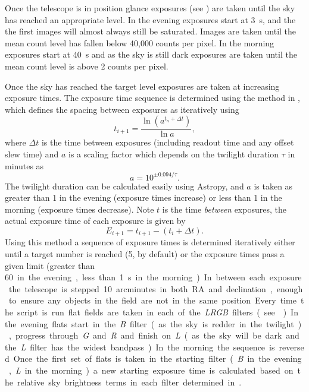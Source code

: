 \begin{colsection}
\begin{colsection}
Once the telescope is in position glance exposures (see ) are taken until the sky has reached an appropriate level. In the evening exposures start at \SI{3}{\second}, and the the first images will almost always still be saturated. Images are taken until the mean count level has fallen below 40,000 counts per pixel. In the morning exposures start at \SI{40}{\second} and as the sky is still dark exposures are taken until the mean count level is above 2 counts per pixel.

Once the sky has reached the target level exposures are taken at increasing exposure times. The exposure time sequence is determined using the method in \citet{flats3}, which defines the spacing between exposures as iteratively using
%
\begin{equation}
    t_{i+1} = \frac{\ln{(a^{t_n+\Delta t})}}{\ln{a}},
    \label{eq:sky}
\end{equation}
%
where $\Delta t$ is the time between exposures (including readout time and any offset slew time) and $a$ is a scaling factor which depends on the twilight duration $\tau$ in minutes as
%
\begin{equation}
    a = 10^{\pm 0.094/\tau}.
    \label{eq:sky2}
\end{equation}
%
The twilight duration can be calculated easily using Astropy, and $a$ is taken as greater than 1 in the evening (exposure times increase) or less than 1 in the morning (exposure times decrease). Note $t$ is the time \emph{between} exposures, the actual exposure time of each exposure is given by
%
\begin{equation}
    E_{i+1} = t_{i+1} - (t_i + \Delta t).
    \label{eq:sky3}
\end{equation}
%
Using this method a sequence of exposure times is determined iteratively either until a target number is reached (5, by default) or the exposure times pass a given limit (greater than \SI{60} in the evening, less than \SI{1}{\second} in the morning). In between each exposure the telescope is stepped 10~arcminutes in both RA and declination, enough to ensure any objects in the field are not in the same position.

Every time the script is run flat fields are taken in each of the \textit{LRGB} filters (see ). In the evening flats start in the \textit{B} filter (as the sky is redder in the twilight), progress through \textit{G} and \textit{R} and finish on \textit{L} (as the sky will be dark and the \textit{L} filter has the widest bandpass). In the morning the sequence is reversed. Once the first set of flats is taken in the starting filter (\textit{B} in the evening, \textit{L} in the morning) a new starting exposure time is calculated based on the relative sky brightness terms in each filter determined in .


\end{colsection}
\end{colsection}
